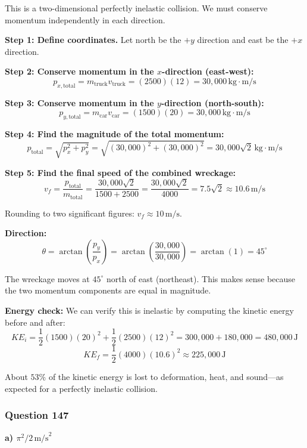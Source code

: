 \documentclass[12pt,letterpaper]{article}
\begin{document}
\begin{explanationbox}
This is a two-dimensional perfectly inelastic collision. We must conserve momentum independently in each direction.

\textbf{Step 1: Define coordinates.} Let north be the $+y$ direction and east be the $+x$ direction.

\textbf{Step 2: Conserve momentum in the $x$-direction (east-west):}
\[
p_{x,\text{total}} = m_{\text{truck}} v_{\text{truck}} = (2500)(12) = 30{,}000\,\text{kg}\cdot\text{m/s}
\]

\textbf{Step 3: Conserve momentum in the $y$-direction (north-south):}
\[
p_{y,\text{total}} = m_{\text{car}} v_{\text{car}} = (1500)(20) = 30{,}000\,\text{kg}\cdot\text{m/s}
\]

\textbf{Step 4: Find the magnitude of the total momentum:}
\[
p_{\text{total}} = \sqrt{p_x^2 + p_y^2} = \sqrt{(30{,}000)^2 + (30{,}000)^2} = 30{,}000\sqrt{2}\,\text{kg}\cdot\text{m/s}
\]

\textbf{Step 5: Find the final speed of the combined wreckage:}
\[
v_f = \frac{p_{\text{total}}}{m_{\text{total}}} = \frac{30{,}000\sqrt{2}}{1500 + 2500} = \frac{30{,}000\sqrt{2}}{4000} = 7.5\sqrt{2} \approx 10.6\,\text{m/s}
\]

Rounding to two significant figures: $v_f \approx 10\,\text{m/s}$.

\textbf{Direction:}
\[
\theta = \arctan\left(\frac{p_y}{p_x}\right) = \arctan\left(\frac{30{,}000}{30{,}000}\right) = \arctan(1) = 45^\circ
\]

The wreckage moves at $45^\circ$ north of east (northeast). This makes sense because the two momentum components are equal in magnitude.

\textbf{Energy check:} We can verify this is inelastic by computing the kinetic energy before and after:
\[
KE_i = \frac{1}{2}(1500)(20)^2 + \frac{1}{2}(2500)(12)^2 = 300{,}000 + 180{,}000 = 480{,}000\,\text{J}
\]
\[
KE_f = \frac{1}{2}(4000)(10.6)^2 \approx 225{,}000\,\text{J}
\]

About $53\%$ of the kinetic energy is lost to deformation, heat, and sound---as expected for a perfectly inelastic collision.
\end{explanationbox}

\subsubsection*{Question 147}

\begin{answerbox}
\textbf{a) $\pi^2/2\,\text{m/s}^2$}
\end{answerbox}
\end{document}
